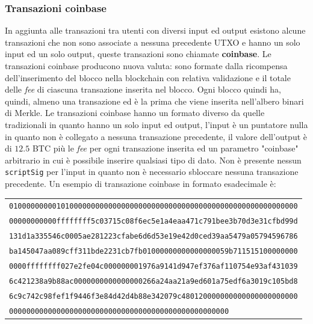 \subsubsection{Transazioni coinbase}
In aggiunta alle transazioni tra utenti con diversi input ed output esistono alcune transazioni che non sono associate a nessuna precedente UTXO e hanno un solo input ed un solo output, queste transazioni sono chiamate \textbf{coinbase}.\newline
Le transazioni coinbase producono nuova valuta: sono formate dalla ricompensa dell'inserimento del blocco nella blockchain con relativa validazione e il totale delle \textit{fee} di ciascuna transazione inserita nel blocco. Ogni blocco quindi ha, quindi, almeno una transazione ed è la prima che viene inserita nell'albero binari di Merkle.\newline
Le transazioni coinbase hanno un formato diverso da quelle tradizionali in quanto hanno un solo input ed output, l'input è un puntatore nulla in quanto non è collegato a nessuna transazione precedente, il valore dell'output è di $12.5$ BTC più le \textit{fee} per ogni transazione inserita ed un parametro "coinbase" arbitrario in cui è possibile inserire qualsiasi tipo di dato. Non è presente nessun \texttt{scriptSig} per l'input in quanto non è necessario sbloccare nessuna transazione precedente.\newline
Un esempio di transazione coinbase in formato esadecimale è:
\begin{table}[H]
    \begin{tabular}{l}
        \texttt{0100000000010100000000000000000000000000000000000000000000000000000}\\
        \texttt{00000000000ffffffff5c03715c08f6ec5e1a4eaa471c791bee3b70d3e31cfbd99d}\\
        \texttt{131d1a335546c0005ae281223cfabe6d6d53e19e42d0ced39aa5479a05794596786}\\
        \texttt{ba145047aa089cff311bde2231cb7fb01000000000000000059b711515100000000}\\
        \texttt{0000ffffffff027e2fe04c000000001976a9141d947ef376af110754e93af431039}\\
        \texttt{6c421238a9b88ac0000000000000000266a24aa21a9ed601a75edf6a3019c105bd8}\\
        \texttt{6c9c742c98fef1f9446f3e84d42d4b88e342079c480120000000000000000000000}\\
        \texttt{000000000000000000000000000000000000000000000000000}
    \end{tabular}
\end{table}

